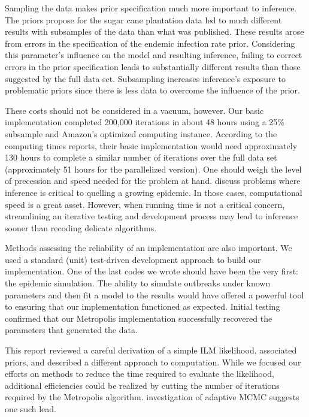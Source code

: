 \documentclass{uwstat572}
\begin{document}
Sampling the data makes prior specification much more important to inference. 
The priors \citet{Brown} propose for the sugar cane plantation data led to much different results with subsamples of the data than what was published. 
These results arose from errors in the specification of the endemic infection rate prior. 
Considering this parameter's influence on the model and resulting inference, failing to correct errors in the prior specification leads to substantially different results than those suggested by the full data set. 
Subsampling increases inference's exposure to problematic priors since there is less data to overcome the influence of the prior. 

These costs should not be considered in a vacuum, however. 
Our basic implementation completed 200,000 iterations in about 48 hours using a 25\% subsample and Amazon's optimized computing instance. 
According to the computing times \citet{Brown} reports, their basic implementation would need approximately 130 hours to complete a similar number of iterations over the full data set (approximately 51 hours for the parallelized version). 
One should weigh the level of precession and speed needed for the problem at hand. 
\citet{Jewell} discuss problems where inference is critical to quelling a growing epidemic. 
In those cases, computational speed is a great asset. 
However, when running time is not a critical concern, streamlining an iterative testing and development process may lead to inference sooner than recoding delicate algorithms. 

Methods assessing the reliability of an implementation are also important.
We used a standard (unit) test-driven development approach to build our implementation. 
One of the last codes we wrote should have been the very first: the epidemic simulation. 
The ability to simulate outbreaks under known parameters and then fit a model to the results would have offered a powerful tool to ensuring that our implementation functioned as expected. 
Initial testing confirmed that our Metropolis implementation successfully recovered the parameters that generated the data. 

This report reviewed a careful derivation of a simple ILM likelihood, associated priors, and described a different approach to computation. 
While we focused our efforts on methods to reduce the time required to evaluate the likelihood, additional efficiencies could be realized by cutting the number of iterations required by the Metropolis algorithm. 
\citet{Roberts} investigation of adaptive MCMC suggests one such lead. 
\end{document}
